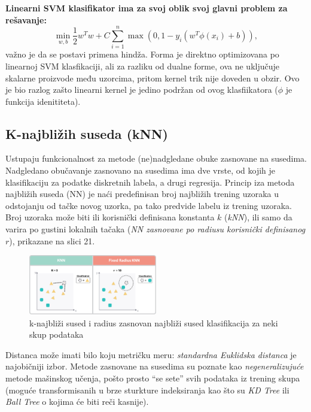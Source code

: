 \documentclass[fontsize=12bp, paper=a4]{scrarticle}
\begin{document}
\vbox{}

\textbf{Linearni SVM klasifikator ima za svoj oblik svoj  glavni problem za rešavanje:}
$$\min_ {w, b} \frac{1}{2} w^T w + C \sum_{i=1}^{n}\max(0, 1 - y_i (w^T \phi(x_i) + b)),$$
važno je da se postavi primena hindža\cite{hinge}. Forma je direktno optimizovana po linearnoj SVM klasfikaciji, ali za razliku od dualne forme, ova ne uključuje skalarne proizvode među uzorcima, pritom kernel trik nije doveden u obzir. Ovo je bio razlog zašto linearni kernel je jedino podržan od ovog klasfiikatora ($\phi$ je funkcija idenititeta).

\vbox{}


\newpage
\subsection{K-najbližih suseda (kNN)\cite{knn}}

Ustupaju funkcionalnost za metode (ne)nadgledane obuke zasnovane na susedima. Nadgledano obučavanje zasnovano na susedima ima dve vrste, od kojih je klasifikaciju za podatke diskretnih labela, a drugi regresija. Princip iza metoda najbližih suseda (NN) je naći predefinisan broj najbližih trening uzoraka u odstojanju od tačke novog uzorka, pa tako predvide labelu iz trening uzoraka. Broj uzoraka može biti ili korisnički definisana konstanta $k$ (\textit{kNN}), ili samo da varira po gustini lokalnih tačaka (\textit{NN zasnovane po radiusu korisnički definisanog $r$}), prikazane na slici 21. 

\begin{figure}[h!]
    \centering
    \includegraphics[width=0.5\textwidth]{image-21.png}
    \caption{k-najbliži sused i radius zasnovan najbliži sused klasifikacija za neki skup podataka}
\end{figure}

Distanca može imati bilo koju metričku meru: \textit{standardna Euklidska distanca} je najobičniji izbor. Metode zasnovane na susedima su poznate kao \textit{negeneralizujuće} metode mašinskog učenja, pošto prosto ``se sete'' svih podataka iz trening skupa (moguće transformisanih u brze sturkture indeksiranja kao što su \textit{KD Tree} ili \textit{Ball Tree} o kojima će biti reči kasnije). 
\end{document}

